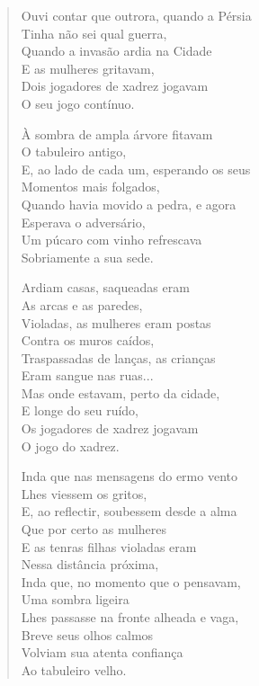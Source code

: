 \begin{verse}
Ouvi contar que outrora, quando a Pérsia \\
Tinha não sei qual guerra, \\
Quando a invasão ardia na Cidade \\
E as mulheres gritavam, \\
Dois jogadores de xadrez jogavam \\
O seu jogo contínuo.

À sombra de ampla árvore fitavam \\
O tabuleiro antigo, \\
E, ao lado de cada um, esperando os seus \\
Momentos mais folgados, \\
Quando havia movido a pedra, e agora \\
Esperava o adversário, \\
Um púcaro com vinho refrescava \\
Sobriamente a sua sede.

Ardiam casas, saqueadas eram \\
As arcas e as paredes, \\
Violadas, as mulheres eram postas \\
Contra os muros caídos, \\
Traspassadas de lanças, as crianças \\
Eram sangue nas ruas... \\
Mas onde estavam, perto da cidade, \\
E longe do seu ruído, \\
Os jogadores de xadrez jogavam \\
O jogo do xadrez.

Inda que nas mensagens do ermo vento \\
Lhes viessem os gritos, \\
E, ao reflectir, soubessem desde a alma \\
Que por certo as mulheres \\
E as tenras filhas violadas eram \\
Nessa distância próxima, \\
Inda que, no momento que o pensavam, \\
Uma sombra ligeira \\
Lhes passasse na fronte alheada e vaga, \\
Breve seus olhos calmos \\
Volviam sua atenta confiança \\
Ao tabuleiro velho.


\end{verse}
